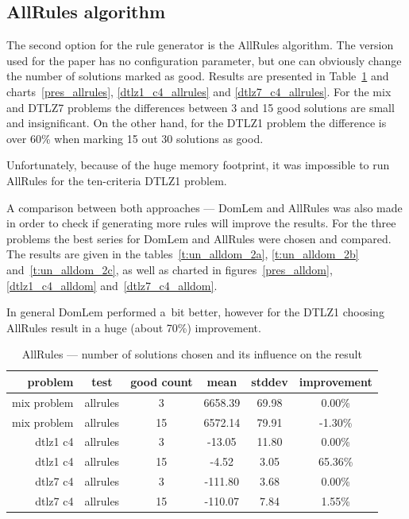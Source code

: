 \clearpage{}
\subsection{AllRules algorithm}

The second option for the rule generator is the AllRules algorithm. The
version used for the paper has no configuration parameter, but one can
obviously change the number of solutions marked as good. Results are presented
in Table~\ref{t:un_allrules_1} and charts~\ref{pres_allrules},
\ref{dtlz1_c4_allrules} and \ref{dtlz7_c4_allrules}. For the mix and DTLZ7
problems the differences between 3 and 15 good solutions are small and
insignificant. On the other hand, for the DTLZ1 problem the difference is over
60\% when marking 15 out 30 solutions as good.

Unfortunately, because of the huge memory footprint, it was impossible to run
AllRules for the ten-criteria DTLZ1 problem.

A comparison between both approaches --- DomLem and AllRules was also made in
order to check if generating more rules will improve the results. For the
three problems the best series for DomLem and AllRules were chosen and
compared. The results are given in the tables~\ref{t:un_alldom_2a},
\ref{t:un_alldom_2b} and~\ref{t:un_alldom_2c}, as well as charted in
figures~\ref{pres_alldom}, \ref{dtlz1_c4_alldom} and~\ref{dtlz7_c4_alldom}.

In general DomLem performed a~bit better, however for the DTLZ1 choosing
AllRules result in a huge (about 70\%) improvement.

\begin{table}[htb]
  \centering
  \begin{tabular}{r c c c c c}
    \hline
    problem & test & good count & mean & stddev & improvement \\
    \hline
    \hline
mix problem & allrules & 3 & 6658.39 & 69.98 & 0.00\% \\
mix problem & allrules & 15& 6572.14 & 79.91 & -1.30\% \\
    \hline
dtlz1 c4 & allrules & 3 &  -13.05 & 11.80 & 0.00\% \\
dtlz1 c4 & allrules & 15 &   -4.52 & 3.05 & 65.36\% \\
    \hline
dtlz7 c4 & allrules & 3 &-111.80 & 3.68 & 0.00\% \\
dtlz7 c4 & allrules &15 & -110.07 & 7.84 & 1.55\% \\
\hline
  \end{tabular}
  \caption{AllRules --- number of solutions chosen and its influence on the result}
  \label{t:un_allrules_1}
\end{table}


